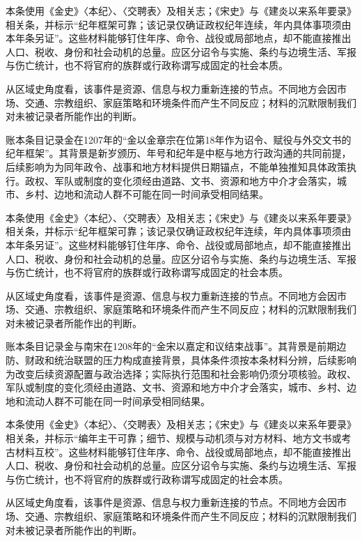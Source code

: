 本条使用《金史》〈本纪〉、〈交聘表〉及相关志；《宋史》与《建炎以来系年要录》相关条，并标示“纪年框架可靠；该记录仅确证政权纪年连续，年内具体事项须由本年条另证”。这些材料能够钉住年序、命令、战役或局部地点，却不能直接推出人口、税收、身份和社会动机的总量。应区分诏令与实施、条约与边境生活、军报与伤亡统计，也不将官府的族群或行政称谓写成固定的社会本质。

从区域史角度看，该事件是资源、信息与权力重新连接的节点。不同地方会因市场、交通、宗教组织、家庭策略和环境条件而产生不同反应；材料的沉默限制我们对未被记录者所能作出的判断。

账本条目记录金在1207年的“金以金章宗在位第18年作为诏令、赋役与外交文书的纪年框架”。其背景是新岁颁历、年号和纪年是中枢与地方行政沟通的共同前提，后续影响为为同年政令、战事和地方材料提供日期锚点，不能单独推知具体政策执行。政权、军队或制度的变化须经由道路、文书、资源和地方中介才会落实，城市、乡村、边地和流动人群不可能在同一时间承受相同结果。

本条使用《金史》〈本纪〉、〈交聘表〉及相关志；《宋史》与《建炎以来系年要录》相关条，并标示“纪年框架可靠；该记录仅确证政权纪年连续，年内具体事项须由本年条另证”。这些材料能够钉住年序、命令、战役或局部地点，却不能直接推出人口、税收、身份和社会动机的总量。应区分诏令与实施、条约与边境生活、军报与伤亡统计，也不将官府的族群或行政称谓写成固定的社会本质。

从区域史角度看，该事件是资源、信息与权力重新连接的节点。不同地方会因市场、交通、宗教组织、家庭策略和环境条件而产生不同反应；材料的沉默限制我们对未被记录者所能作出的判断。

账本条目记录金与南宋在1208年的“金宋以嘉定和议结束战事”。其背景是前期边防、财政和统治联盟的压力构成直接背景，具体条件须按本条材料分辨，后续影响为改变后续资源配置与政治选择；实际执行范围和社会影响仍须分项核验。政权、军队或制度的变化须经由道路、文书、资源和地方中介才会落实，城市、乡村、边地和流动人群不可能在同一时间承受相同结果。

本条使用《金史》〈本纪〉、〈交聘表〉及相关志；《宋史》与《建炎以来系年要录》相关条，并标示“编年主干可靠；细节、规模与动机须与对方材料、地方文书或考古材料互校”。这些材料能够钉住年序、命令、战役或局部地点，却不能直接推出人口、税收、身份和社会动机的总量。应区分诏令与实施、条约与边境生活、军报与伤亡统计，也不将官府的族群或行政称谓写成固定的社会本质。

从区域史角度看，该事件是资源、信息与权力重新连接的节点。不同地方会因市场、交通、宗教组织、家庭策略和环境条件而产生不同反应；材料的沉默限制我们对未被记录者所能作出的判断。

